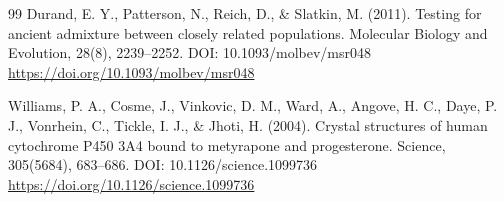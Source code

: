 \documentclass[11pt]{article}
\begin{document}
\begin{thebibliography}{99}
Durand, E. Y., Patterson, N., Reich, D., \& Slatkin, M. (2011). Testing for ancient admixture between closely related populations. Molecular Biology and Evolution, 28(8), 2239--2252. DOI: 10.1093/molbev/msr048 \url{https://doi.org/10.1093/molbev/msr048}

Williams, P. A., Cosme, J., Vinkovic, D. M., Ward, A., Angove, H. C., Daye, P. J., Vonrhein, C., Tickle, I. J., \& Jhoti, H. (2004). Crystal structures of human cytochrome P450 3A4 bound to metyrapone and progesterone. Science, 305(5684), 683--686. DOI: 10.1126/science.1099736 \url{https://doi.org/10.1126/science.1099736}

\end{thebibliography}
\end{document}
